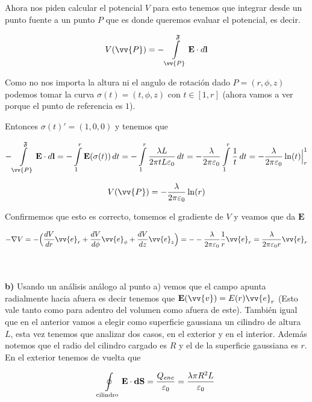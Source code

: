 \documentclass[leqno, 12pt, twoside, letterpaper]{book}
\def\efield{\textbf{E}}
\def\vdiff{\textbf{dS}}
\def\lineInt#1#2#3{\int\displaylimits_{#2}^{#3} #1 \cdot d\textbf{l}}
\begin{document}
Ahora nos piden calcular el potencial $V$ para esto tenemos que integrar desde un punto fuente a un punto $P$ que es donde queremos evaluar el potencial, es decir.

\[ V(\vv{P}) = -\lineInt{\efield}{\vv{P}}{\mathfrak{F}}  \] 

Como no nos importa la altura ni el angulo de rotación dado $P = (r, \phi, z)$ podemos tomar la curva $\sigma(t) = (t, \phi, z)$ con $t \in [1, r]$ (ahora vamos a ver porque el punto de referencia es $1$).

Entonces $\sigma(t)' = (1, 0, 0)$ y tenemos que


$$ -\lineInt{\efield}{\vv{P}}{\mathfrak{F}} = - \int\displaylimits_{1}^{r} \efield(\sigma(t)) \, dt  
=  - \int\displaylimits_{1}^{r} \dfrac{\lambda L}{2\pi t L \varepsilon_0} \, dt 
=  - \dfrac{\lambda }{2\pi  \varepsilon_0} \int\displaylimits_{1}^{r} \dfrac{1}{t} \, dt = - \dfrac{\lambda }{2\pi  \varepsilon_0} \ln(t) \Big\rvert_{r}^{1} $$

\begin{exbox}
$$  V(\vv{P}) = - \dfrac{\lambda }{2\pi  \varepsilon_0} \ln(r) 
$$ 
\end{exbox}

Confirmemos que esto es correcto, tomemos el gradiente de $V$ y veamos que da $\efield$

$$ - \nabla V = - \Big(\dfrac{dV}{dr} \vv{e}_r + \dfrac{dV}{d\phi} \vv{e}_{\phi} + \dfrac{dV}{dz} \vv{e}_z\Big) = - - \dfrac{\lambda}{2\pi \varepsilon_0} \dfrac{1}{r} \vv{e}_r =  \dfrac{\lambda}{2\pi \varepsilon_0 r} \vv{e}_r $$

\hfill\\
\hfill\\
\textbf{b)} Usando un análisis análogo al punto a) vemos que el campo apunta radialmente hacia afuera es decir tenemos que $\efield(\vv{v}) = E(r) \vv{e}_r$ (Esto vale tanto como para adentro del volumen como afuera de este). También igual que en el anterior vamos a elegir como superficie gaussiana un cilindro de altura $L$, esta vez tenemos que analizar dos casos, en el exterior y en el interior. Además notemos que el radio del cilindro cargado es $R$ y el de la superficie gaussiana es $r$. 
\hfill\\

En el exterior tenemos de vuelta que  

\[ \oint\displaylimits_{\textrm{cilindro}} \efield \cdot \vdiff = \dfrac{Q_{enc}}{\varepsilon_0} = \dfrac{\lambda\pi R^2 L}{\varepsilon_0} \]
\end{document}
